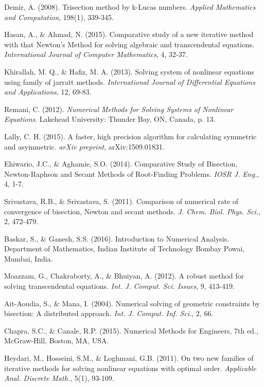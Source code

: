 \documentclass[amsmath, amssymb, aps]{revtex4-2}
\begin{document}
\begin{thebibliography}{99}
Demir, A. (2008). Trisection method by k-Lucas numbers. \textit{Applied Mathematics and Computation}, 198(1), 339-345.

Hasan, A., \& Ahmad, N. (2015). Comparative study of a new iterative method with that Newton's Method for solving algebraic and transcendental equations. \textit{International Journal of Computer Mathematics}, 4, 32-37.

Khirallah, M. Q., \& Hafiz, M. A. (2013). Solving system of nonlinear equations using family of jarratt methods. \textit{International Journal of Differential Equations and Applications}, 12, 69-83.

Remani, C. (2012). \textit{Numerical Methods for Solving Systems of Nonlinear Equations}. Lakehead University: Thunder Bay, ON, Canada, p. 13.

Lally, C. H. (2015). A faster, high precision algorithm for calculating symmetric and asymmetric. \textit{arXiv preprint}, arXiv:1509.01831.

Ehiwario, J.C., \& Aghamie, S.O. (2014). Comparative Study of Bisection, Newton-Raphson and Secant Methods of Root-Finding Problems. \textit{IOSR J. Eng.}, 4, 1-7.

Srivastava, R.B., \& Srivastava, S. (2011). Comparison of numerical rate of convergence of bisection, Newton and secant methods. \textit{J. Chem. Biol. Phys. Sci.}, 2, 472-479.

Baskar, S., \& Ganesh, S.S. (2016). Introduction to Numerical Analysis. Department of Mathematics, Indian Institute of Technology Bombay Powai, Mumbai, India.

Moazzam, G., Chakraborty, A., \& Bhuiyan, A. (2012). A robust method for solving transcendental equations. \textit{Int. J. Comput. Sci. Issues}, 9, 413-419.

Ait-Aoudia, S., \& Mana, I. (2004). Numerical solving of geometric constraints by bisection: A distributed approach. \textit{Int. J. Comput. Inf. Sci.}, 2, 66.

Chapra, S.C., \& Canale, R.P. (2015). Numerical Methods for Engineers, 7th ed., McGraw-Hill, Boston, MA, USA.

Heydari, M., Hosseini, S.M., \& Loghmani, G.B. (2011). On two new families of iterative methods for solving nonlinear equations with optimal order. \textit{Applicable Anal. Discrete Math.}, 5(1), 93-109.


\end{thebibliography}
\end{document}
